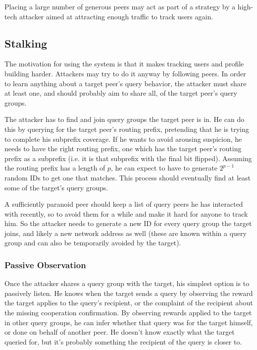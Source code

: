 Placing a large number of generous peers may act as part of a strategy by a
high-tech attacker aimed at attracting enough traffic to track users again.

\subsection{Stalking}
\label{sec:desc_stalking}
The motivation for using the system is that it makes tracking users and profile
building harder. Attackers may try to do it anyway by following peers. In order
to learn anything about a target peer's query behavior, the attacker must share
at least one, and should probably aim to share all, of the target peer's query
groups.

The attacker has to find and join query groups the target peer is in. He can do
this by querying for the target peer's routing prefix, pretending that he is
trying to complete his subprefix coverage. If he wants to avoid arousing
suspicion, he needs to have the right routing prefix, one which has the target
peer's routing prefix as a subprefix (i.e. it is that subprefix with the final
bit flipped). Assuming the routing prefix has a length of $p$, he can expect to
have to generate $2^{p-1}$ random IDs to get one that matches. This process
should eventually find at least some of the target's query groups.

A sufficiently paranoid peer should keep a list of query peers he has interacted
with recently, so to avoid them for a while and make it hard for anyone to track
him. So the attacker needs to generate a new ID for every query group the target
joins, and likely a new network address as well (these are known within a query
group and can also be temporarily avoided by the target).

\subsubsection{Passive Observation}
Once the attacker shares a query group with the target, his simplest option is
to passively listen. He knows when the target sends a query by observing the
reward the target applies to the query's recipient, or the complaint of the
recipient about the missing cooperation confirmation. By observing rewards
applied to the target in other query groups, he can infer whether that query was
for the target himself, or done on behalf of another peer. He doesn't know
exactly what the target queried for, but it's probably something the recipient
of the query is closer to.


